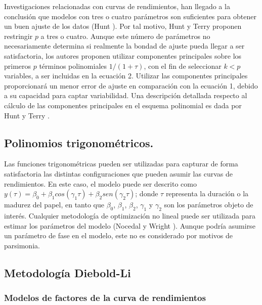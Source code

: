 \documentclass[
  12pt,
]{krantz}
\begin{document}
Investigaciones relacionadas con curvas de rendimientos, han llegado a
la conclusión que modelos con tres o cuatro parámetros son suficientes
para obtener un buen ajuste de los datos (Hunt \cite{H}). Por tal motivo,
Hunt y Terry \cite{HT} proponen restringir \(p\) a tres o cuatro. Aunque este
número de parámetros no necesariamente determina si realmente la
bondad de ajuste pueda llegar a ser satisfactoria, los autores proponen
utilizar componentes principales sobre los primeros \(p\) términos
polinomiales \(1/(1 + \tau)\), con el fin de seleccionar \(k<p\) variables, a ser
incluidas en la ecuación 2. Utilizar las componentes principales
proporcionará un menor error de ajuste en comparación con la ecuación 1,
debido a su capacidad para captar variabilidad. Una descripción
detallada respecto al cálculo de las componentes principales en el
esquema polinomial es dada por Hunt y Terry \cite{HT}.

\hypertarget{polinomios-trigonometricos.}{%
\subsection{Polinomios trigonométricos.}\label{polinomios-trigonometricos.}}

Las funciones trigonométricas pueden ser utilizadas para capturar de
forma satisfactoria las distintas configuraciones que pueden asumir las
curvas de rendimientos. En este caso, el modelo puede ser descrito como
\(y(\tau) = \beta_{0} + \beta_{1}cos(\gamma_{1}\tau) + \beta_{2}sen(\gamma_{2}\tau)\); donde \(\tau\) representa la duración o la
madurez del papel, en tanto que \(\beta_{0}\), \(\beta_{1}\), \(\beta_{2}\), \(\gamma_{1}\) y \(\gamma_{2}\) son los parámetros
objeto de interés. Cualquier metodología de optimización no lineal puede
ser utilizada para estimar los parámetros del modelo (Nocedal y Wright
\cite{NW}). Aunque podría asumirse un parámetro de fase en el modelo, este
no es considerado por motivos de parsimonia.

\hypertarget{metodologia-diebold-li}{%
\subsection{Metodología Diebold-Li}\label{metodologia-diebold-li}}

\hypertarget{modelos-de-factores-de-la-curva-de-rendimientos}{%
\subsubsection{Modelos de factores de la curva de rendimientos}\label{modelos-de-factores-de-la-curva-de-rendimientos}}
\end{document}
